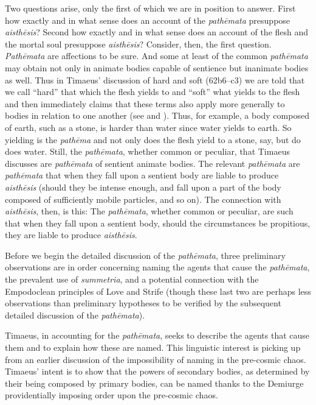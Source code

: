 Two questions arise, only the first of which we are in position to answer. First how exactly and in what sense does an account of the \emph{pathēmata} presuppose \emph{aisthēsis}? Second how exactly and in what sense does an account of the flesh and the mortal soul presuppose \emph{aisthēsis}? Consider, then, the first question. \emph{Pathēmata} are affections to be sure. And some at least of the common \emph{pathēmata} may obtain not only in animate bodies capable of sentience but inanimate bodies as well. Thus in Timaeus' discussion of hard and soft (62b6--c3) we are told that we call ``hard'' that which the flesh yields to and ``soft'' what yields to the flesh and then immediately claims that these terms also apply more generally to bodies in relation to one another (see \citealt[228, n6]{Archer-Hind:1888qd} and \citealt[110]{OBrien:1984ji}). Thus, for example, a body composed of earth, such as a stone, is harder than water since water yields to earth. So yielding is the \emph{pathēma} and not only does the flesh yield to a stone, say, but do does water. Still, the \emph{pathēmata}, whether common or peculiar, that Timaeus discusses are \emph{pathēmata} of sentient animate bodies. The relevant \emph{pathēmata} are \emph{pathēmata} that when they fall upon a sentient body are liable to produce \emph{aisthēsis} (should they be intense enough, and fall upon a part of the body composed of sufficiently mobile particles, and so on). The connection with \emph{aisthēsis}, then, is this: The \emph{pathēmata}, whether common or peculiar, are such that when they fall upon a sentient body, should the circumstances be propitious, they are liable to produce \emph{aisthēsis}.

Before we begin the detailed discussion of the \emph{pathēmata}, three preliminary observations are in order concerning naming the agents that cause the \emph{pathēmata}, the prevalent use of \emph{summetria}, and a potential connection with the Empodoclean principles of Love and Strife (though these last two are perhaps less observations than preliminary hypotheses to be verified by the subsequent detailed discussion of the \emph{pathēmata}).

Timaeus, in accounting for the \emph{pathēmata}, seeks to describe the agents that cause them and to explain how these are named. This linguistic interest is picking up from an earlier discussion of the impossibility of naming in the pre-cosmic chaos. Timaeus' intent is to show that the powers of secondary bodies, as determined by their being composed by primary bodies, can be named thanks to the Demiurge providentially imposing order upon the pre-cosmic chaos.

